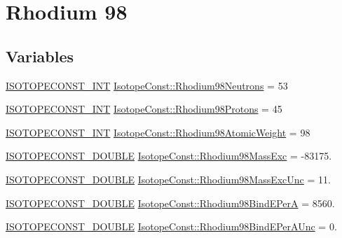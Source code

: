 \hypertarget{group___isotope_const-_rhodium-_rh98}{}\section{Rhodium 98}
\label{group___isotope_const-_rhodium-_rh98}
\subsection*{Variables}
\begin{DoxyCompactItemize}
\item 
\mbox{\hyperlink{group___isotope_const-_macros_ga5f18360b3e99483a35c32d789e62621c}{I\+S\+O\+T\+O\+P\+E\+C\+O\+N\+S\+T\+\_\+\+I\+NT}} \mbox{\hyperlink{group___isotope_const-_rhodium-_rh98_ga07e2a1674800ac6a2a9487ee4b880a03}{Isotope\+Const\+::\+Rhodium98\+Neutrons}} = 53
\item 
\mbox{\hyperlink{group___isotope_const-_macros_ga5f18360b3e99483a35c32d789e62621c}{I\+S\+O\+T\+O\+P\+E\+C\+O\+N\+S\+T\+\_\+\+I\+NT}} \mbox{\hyperlink{group___isotope_const-_rhodium-_rh98_gaf8062dd7b2bdd2b78e498228dd5875ca}{Isotope\+Const\+::\+Rhodium98\+Protons}} = 45
\item 
\mbox{\hyperlink{group___isotope_const-_macros_ga5f18360b3e99483a35c32d789e62621c}{I\+S\+O\+T\+O\+P\+E\+C\+O\+N\+S\+T\+\_\+\+I\+NT}} \mbox{\hyperlink{group___isotope_const-_rhodium-_rh98_gade04325f1ad8901ffa75c91a31a6e0b5}{Isotope\+Const\+::\+Rhodium98\+Atomic\+Weight}} = 98
\item 
\mbox{\hyperlink{group___isotope_const-_macros_ga8f45a7272ce02c0b4c65c44636ed719a}{I\+S\+O\+T\+O\+P\+E\+C\+O\+N\+S\+T\+\_\+\+D\+O\+U\+B\+LE}} \mbox{\hyperlink{group___isotope_const-_rhodium-_rh98_gadc109d819559a8d07ed4f253f0281bc4}{Isotope\+Const\+::\+Rhodium98\+Mass\+Exc}} = -\/83175.
\item 
\mbox{\hyperlink{group___isotope_const-_macros_ga8f45a7272ce02c0b4c65c44636ed719a}{I\+S\+O\+T\+O\+P\+E\+C\+O\+N\+S\+T\+\_\+\+D\+O\+U\+B\+LE}} \mbox{\hyperlink{group___isotope_const-_rhodium-_rh98_ga977e83362c2a12dd26d34c378232486b}{Isotope\+Const\+::\+Rhodium98\+Mass\+Exc\+Unc}} = 11.
\item 
\mbox{\hyperlink{group___isotope_const-_macros_ga8f45a7272ce02c0b4c65c44636ed719a}{I\+S\+O\+T\+O\+P\+E\+C\+O\+N\+S\+T\+\_\+\+D\+O\+U\+B\+LE}} \mbox{\hyperlink{group___isotope_const-_rhodium-_rh98_ga534c607bac7b63764cd60d481086a7cf}{Isotope\+Const\+::\+Rhodium98\+Bind\+E\+PerA}} = 8560.
\item 
\mbox{\hyperlink{group___isotope_const-_macros_ga8f45a7272ce02c0b4c65c44636ed719a}{I\+S\+O\+T\+O\+P\+E\+C\+O\+N\+S\+T\+\_\+\+D\+O\+U\+B\+LE}} \mbox{\hyperlink{group___isotope_const-_rhodium-_rh98_ga95cf6185fb292e1506cab5ac9de06acc}{Isotope\+Const\+::\+Rhodium98\+Bind\+E\+Per\+A\+Unc}} = 0.

\end{DoxyCompactItemize}
